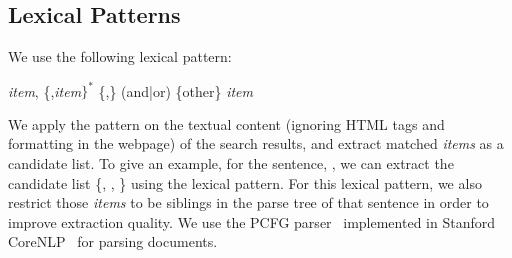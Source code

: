 \subsection{Lexical Patterns}
We use the following lexical pattern:
\begin{center}
\textit{item}, \{,\textit{item}$\}^*$ \{,\} (and|or) \{other\} \textit{item} 
\end{center}
We apply the pattern on the textual content (ignoring HTML tags and formatting in the webpage) of the search results, and extract matched \textit{items} as a candidate list. To give an example, for the sentence, , we can extract the candidate list \{, , \} using the lexical pattern. For this lexical pattern, we also restrict those \textit{items} to be siblings in the parse tree of that sentence in order to improve extraction quality. We use the PCFG parser~\cite{klein2003accurate} implemented in Stanford CoreNLP~\cite{manning2014stanford} for parsing documents.

